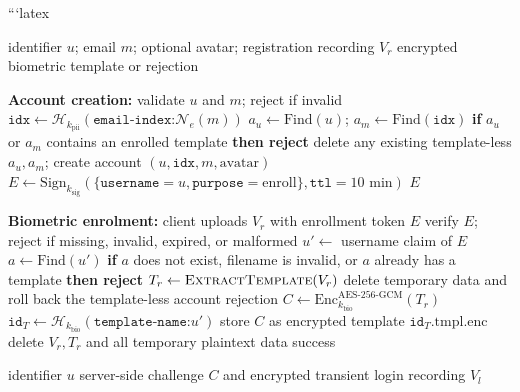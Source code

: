 \documentclass[runningheads]{llncs}
\begin{document}
\iffalse
```latex
{\color{black}
\begin{algorithm}[!tbp]
\caption{\textcolor{black}{User Registration / Enrolment}}
\label{alg:register}
\begin{algorithmic}[1]
\small
\Require identifier $u$; email $m$; optional avatar; registration recording $V_r$
\Ensure encrypted biometric template or rejection

\State \textbf{Account creation:}
\State validate $u$ and $m$; reject if invalid
\State $\texttt{idx}\gets\mathcal{H}_{k_{\mathrm{pii}}}(\texttt{email-index:}\mathcal{N}_e(m))$
\State $a_u\gets\mathrm{Find}(u)$; $a_m\gets\mathrm{Find}(\texttt{idx})$
\State \textbf{if} $a_u$ or $a_m$ contains an enrolled template \textbf{then reject}
\State delete any existing template-less $a_u,a_m$; create account $(u,\texttt{idx},m,\text{avatar})$
\State $E\gets\mathrm{Sign}_{k_{\mathrm{sig}}}(\{\texttt{username}=u,\texttt{purpose}=\mathrm{enroll}\},\texttt{ttl}=10\text{ min})$
\State \Return $E$

\State \textbf{Biometric enrolment:}
\State client uploads $V_r$ with enrollment token $E$
\State verify $E$; reject if missing, invalid, expired, or malformed
\State $u'\gets$ username claim of $E$
\State $a\gets\mathrm{Find}(u')$
\State \textbf{if} $a$ does not exist, filename is invalid, or $a$ already has a template \textbf{then reject}
\State $T_r\gets\textsc{ExtractTemplate}(V_r)$
    \State delete temporary data and roll back the template-less account
    \State \Return rejection
\EndIf
\State $C\gets\mathrm{Enc}^{\mathrm{AES\text{-}256\text{-}GCM}}_{k_{\mathrm{bio}}}(T_r)$
\State $\texttt{id}_T\gets\mathcal{H}_{k_{\mathrm{bio}}}(\texttt{template-name:}u')$
\State store $C$ as encrypted template $\texttt{id}_T.\mathrm{tmpl.enc}$
\State delete $V_r,T_r$ and all temporary plaintext data
\State \Return success
\end{algorithmic}
\end{algorithm}






\begin{algorithm}[!tbp]
\caption{\textcolor{black}{Login and Challenge Issuance}}
\label{alg:challenge}
\begin{algorithmic}[1]
\small
\Require identifier $u$
\Ensure server-side challenge $C$ and encrypted transient login recording $V_l$


\end{algorithmic}
\end{algorithm}}
\end{document}
